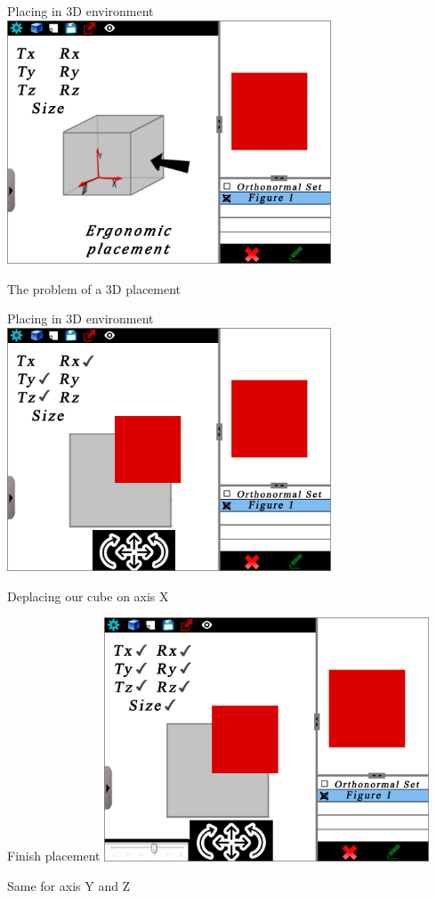 \documentclass[a4paper,10pt]{beamer}
\begin{document}
			\begin{frame}{Placing in 3D environment}
				\includegraphics[height=205pt]{maquette/maquette_5.png}
				
				The problem of a 3D placement
			\end{frame}
			
			\begin{frame}{Placing in 3D environment}
				\includegraphics[height=205pt]{maquette/maquette_6.png}
				
				Deplacing our cube on axis X
			\end{frame}
			
			\begin{frame}{Finish placement}
				\includegraphics[height=205pt]{maquette/maquette_7.png}
				
				Same for axis Y and Z
			\end{frame}
			
\end{document}

